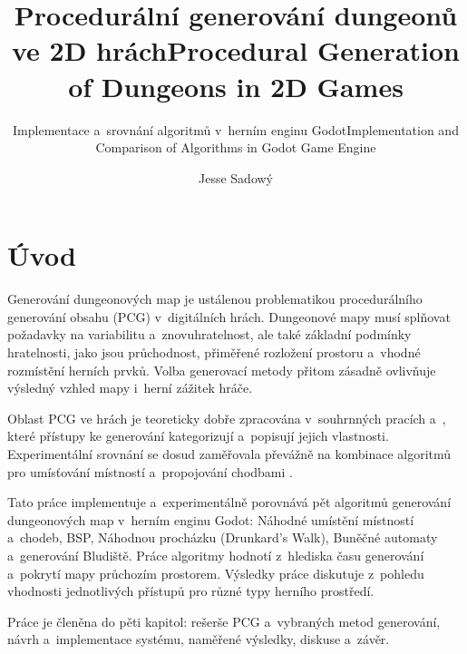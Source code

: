 \documentclass[
   program=itk,
   biblatex,
   figures=true,
   tables=true,
   glossaries,
   index
]{kidiplom}
\title{Procedurální generování dungeonů ve 2D hrách}
\title[english]{Procedural Generation of Dungeons in 2D Games}
\subtitle{Implementace a~srovnání algoritmů v~herním enginu Godot}
\subtitle[english]{Implementation and Comparison of Algorithms in Godot Game Engine}
\author{Jesse Sadowý}
\begin{document}
\maketitle



\newcommand{\BibLaTeX}{\textsc{Bib}\LaTeX}


\section{Úvod}
Generování dungeonových map je ustálenou problematikou procedurálního generování obsahu (PCG) v~digitálních hrách. Dungeonové mapy musí splňovat požadavky na variabilitu a~znovuhratelnost, ale také základní podmínky hratelnosti, jako jsou průchodnost, přiměřené rozložení prostoru a~vhodné rozmístění herních prvků. Volba generovací metody přitom zásadně ovlivňuje výsledný vzhled mapy i~herní zážitek hráče.

Oblast PCG ve hrách je teoreticky dobře zpracována v~souhrnných pracích \cite{Shaker2016} a~\cite{Linden2014}, které přístupy ke generování kategorizují a~popisují jejich vlastnosti. Experimentální srovnání se dosud zaměřovala převážně na kombinace algoritmů pro umísťování místností a~propojování chodbami \cite{Monaghan2019}.

Tato práce implementuje a~experimentálně porovnává pět algoritmů generování dungeonových map v~herním enginu Godot: Náhodné umístění místností a~chodeb, BSP, Náhodnou procházku (Drunkard's Walk), Buněčné automaty a~generování Bludiště. Práce algoritmy hodnotí z~hlediska času generování a~pokrytí mapy průchozím prostorem. Výsledky práce diskutuje z~pohledu vhodnosti jednotlivých přístupů pro různé typy herního prostředí.

Práce je členěna do pěti kapitol: rešerše PCG a~vybraných metod generování, návrh a~implementace systému, naměřené výsledky, diskuse a~závěr.
\end{document}
